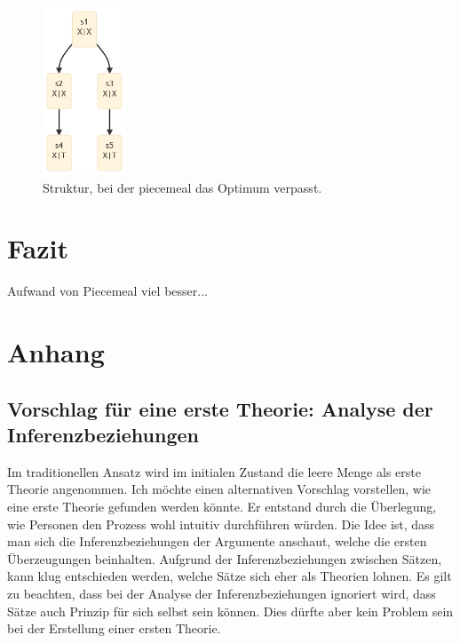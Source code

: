 \documentclass{article}
\begin{document}
\begin{figure}[ht]
  \centering
  \includegraphics[width=\textwidth,height=5cm,keepaspectratio]{images/missed_optima.png}
  \caption{Struktur, bei der piecemeal das Optimum verpasst.\label{fig:missed_optima}}
\end{figure}


\section{Fazit}

Aufwand von Piecemeal viel besser... 


\newpage
\printbibliography

\newpage

\section{Anhang}
\subsection{ Vorschlag für eine erste Theorie: Analyse der Inferenzbeziehungen} \label{better-first-theory}
Im traditionellen Ansatz wird im initialen Zustand die leere Menge als erste Theorie angenommen. Ich möchte einen alternativen Vorschlag vorstellen, wie eine erste Theorie gefunden werden könnte. Er entstand durch die Überlegung, wie Personen den Prozess wohl intuitiv durchführen würden. Die Idee ist, dass man sich die Inferenzbeziehungen der Argumente anschaut, welche die ersten Überzeugungen beinhalten. Aufgrund der Inferenzbeziehungen zwischen Sätzen, kann klug entschieden werden, welche Sätze sich eher als Theorien lohnen. Es gilt zu beachten, dass bei der Analyse der Inferenzbeziehungen ignoriert wird, dass Sätze auch Prinzip für sich selbst sein können. Dies dürfte aber kein Problem sein bei der Erstellung einer ersten Theorie.
\end{document}
